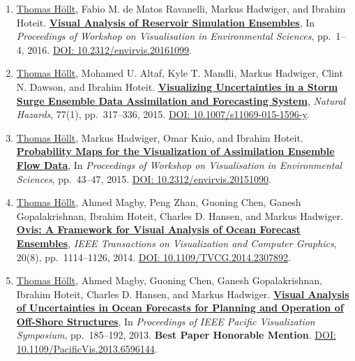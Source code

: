 \documentclass[10pt,a4paper,roman,final]{moderncv}
\newcommand*\highlightauthor[1]{\underline{#1}}
\begin{document}
\begin{enumerate}[leftmargin=0cm,start=2]
\item
\highlightauthor{Thomas Höllt}, Fabio M. de Matos Ravanelli, Markus Hadwiger, and Ibrahim Hoteit.
\href{https://www.thomashollt.com/publications/2016_envirvis/}{\textbf{Visual Analysis of Reservoir Simulation Ensembles}},
In \emph{Proceedings of Workshop on Visualisation in Environmental Sciences}, pp.~1--4,
2016.
\href{https://doi.org/10.2312/envirvis.20161099}{DOI: 10.2312/\allowbreak envirvis.20161099}.


\item
\highlightauthor{Thomas Höllt}, Mohamed U. Altaf, Kyle T. Mandli, Markus Hadwiger, Clint N. Dawson, and Ibrahim Hoteit.
\href{https://www.thomashollt.com/publications/2015_nathazards/}{\textbf{Visualizing Uncertainties in a Storm Surge Ensemble Data Assimilation and Forecasting System}},
\emph{Natural Hazards}, 77(1), pp.~317--336,
2015.
\href{https://doi.org/10.1007/s11069-015-1596-y}{DOI: 10.1007/\allowbreak s11069-015-1596-y}.


\item
\highlightauthor{Thomas Höllt}, Markus Hadwiger, Omar Knio, and Ibrahim Hoteit.
\href{https://www.thomashollt.com/publications/2015_envirvis/}{\textbf{Probability Maps for the Visualization of Assimilation Ensemble Flow Data}},
In \emph{Proceedings of Workshop on Visualisation in Environmental Sciences}, pp.~43--47,
2015.
\href{https://doi.org/10.2312/envirvis.20151090}{DOI: 10.2312/\allowbreak envirvis.20151090}.


\item
\highlightauthor{Thomas Höllt}, Ahmed Magby, Peng Zhan, Guoning Chen, Ganesh Gopalakrishnan, Ibrahim Hoteit, Charles D. Hansen, and Markus Hadwiger.
\href{https://www.thomashollt.com/publications/2014_tvcg/}{\textbf{Ovis: A Framework for Visual Analysis of Ocean Forecast Ensembles}},
\emph{IEEE Transactions on Visualization and Computer Graphics}, 20(8), pp.~1114--1126,
2014.
\href{https://doi.org/10.1109/TVCG.2014.2307892}{DOI: 10.1109/\allowbreak TVCG.2014.2307892}.


\item
\highlightauthor{Thomas Höllt}, Ahmed Magby, Guoning Chen, Ganesh Gopalakrishnan, Ibrahim Hoteit, Charles D. Hansen, and Markus Hadwiger.
\href{https://www.thomashollt.com/publications/2013_pacificvis/}{\textbf{Visual Analysis of Uncertainties in Ocean Forecasts for Planning and Operation of Off-Shore Structures}},
In \emph{Proceedings of IEEE Pacific Visualization Symposium}, pp.~185--192,
2013.
\textbf{Best Paper Honorable Mention}.
\href{https://doi.org/10.1109/PacificVis.2013.6596144}{DOI: 10.1109/\allowbreak PacificVis.2013.6596144}.



\end{enumerate}
\end{document}
